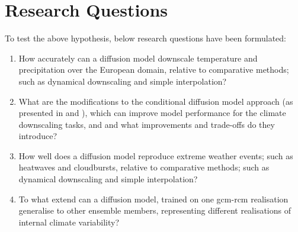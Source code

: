 \section*{Research Questions}
To test the above hypothesis, below research questions have been formulated:
\begin{enumerate}
    \item \label{it:rq1} How accurately can a diffusion model downscale temperature and precipitation over the European domain, relative to comparative methods; such as dynamical downscaling and simple interpolation?
    \item \label{it:rq2} What are the modifications to the conditional diffusion model approach (as presented in \cite{ddpm} and \cite{sr-diffusion}), which can improve model performance for the climate \gls{downscaling} tasks, and and what improvements and trade-offs do they introduce? 
    \item \label{it:rq3} How well does a diffusion model reproduce extreme weather events; such as heatwaves and cloudbursts, relative to comparative methods; such as dynamical downscaling and simple interpolation?
    \item \label{it:rq4} To what extend can a diffusion model, trained on one \gls{gcm}-\gls{rcm} \gls{realisation} generalise to other ensemble members, representing different \glspl{realisation} of internal climate variability?
\end{enumerate}